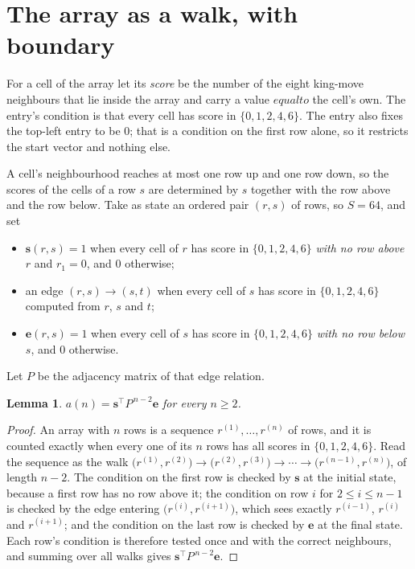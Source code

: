 \documentclass[11pt,a4paper]{article}
\theoremstyle{plain}
\newtheorem{lemma}[theorem]{Lemma}
\theoremstyle{definition}
\begin{document}
\section{The array as a walk, with boundary}

For a cell of the array let its \emph{score} be the number of the eight king-move neighbours that lie inside
the array and carry a value $equal to$ the cell's own. The entry's condition is that every cell
has score in $\{0,1,2,4,6\}$. The entry also fixes the top-left entry to be $0$; that is a condition on the first row alone, so it restricts the start vector and nothing else.

A cell's neighbourhood reaches at most one row up and one row down, so the scores of the
cells of a row $s$ are determined by $s$ together with the row above and the row below.
Take as state an ordered pair $(r,s)$ of rows, so $S=64$, and set
\begin{itemize}
\item $\mathbf{s}(r,s)=1$ when every cell of $r$ has score in $\{0,1,2,4,6\}$ \emph{with no row
above $r$} and $r_1=0$, and $0$ otherwise;
\item an edge $(r,s)\to(s,t)$ when every cell of $s$ has score in $\{0,1,2,4,6\}$ computed from
$r$, $s$ and $t$;
\item $\mathbf{e}(r,s)=1$ when every cell of $s$ has score in $\{0,1,2,4,6\}$ \emph{with no row
below $s$}, and $0$ otherwise.
\end{itemize}
Let $P$ be the adjacency matrix of that edge relation.

\begin{lemma}\label{lem:walk}
$a(n)=\mathbf{s}^{\!\top}P^{\,n-2}\mathbf{e}$ for every $n\ge2$.
\end{lemma}

\begin{proof}
An array with $n$ rows is a sequence $r^{(1)},\dots,r^{(n)}$ of rows, and it is counted
exactly when every one of its $n$ rows has all scores in $\{0,1,2,4,6\}$. Read the sequence as the
walk $\bigl(r^{(1)},r^{(2)}\bigr)\to\bigl(r^{(2)},r^{(3)}\bigr)\to\cdots\to
\bigl(r^{(n-1)},r^{(n)}\bigr)$, of length $n-2$. The condition on the first row is
checked by $\mathbf{s}$ at the initial state, because a first row has no row above it; the
condition on row $i$ for $2\le i\le n-1$ is checked by the edge entering
$\bigl(r^{(i)},r^{(i+1)}\bigr)$, which sees exactly $r^{(i-1)}$, $r^{(i)}$ and
$r^{(i+1)}$; and the condition on the last row is checked by $\mathbf{e}$ at the final
state. Each row's condition is therefore tested once and with the correct neighbours, and
summing over all walks gives $\mathbf{s}^{\!\top}P^{\,n-2}\mathbf{e}$.
\end{proof}
\end{document}
